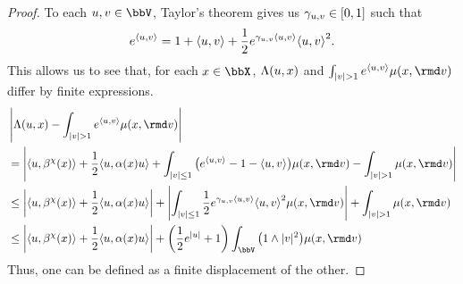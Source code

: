\begin{proof}
  \label{proof:lemma:odeSpace-rationale}
  To each $\momentVar, \vecVar \in \vecSpace$, Taylor's theorem gives us $\gamma_{u,v} \in [0,1]$ such that
  \begin{equation*}
    e^{\langle u , v \rangle} = 1 + {\langle u , v \rangle} + \frac12 e^{\gamma_{u,v} {\langle u , v \rangle}} {\langle u , v \rangle}^2.
  \end{equation*}
  This allows us to see that, for each $\stateVar \in \stateSpace$, $\Lambda(u,x)$ and $\int_{|\markVar|>1} e^\prj{\momentVar}{\markVar} \affJump(\stateVar,\rmd\markVar)$ differ by finite expressions.
  \begin{align*}
    &\left|\ode(\momentVar, \stateVar) - \int_{|\markVar|>1} e^\prj{\momentVar}{\vecVar} \affJump(\stateVar, \rmd\markVar) \right| \tag*{} \\
    &= \left|\prj{\momentVar}{\affDrift^\trunc(\stateVar)} + \frac12\prj{\momentVar}{\affDiff(\stateVar)\momentVar} + \int_{|\vecVar|\leq 1} \big( e^\prj{\momentVar}{\vecVar} - 1 - \prj{\momentVar}{\vecVar} \big) \affJump(\stateVar,\rmd\markVar) - \int_{|\vecVar|>1} \affJump(\stateVar,\rmd\markVar) \right| \\
    &\leq \left|\prj{\momentVar}{\affDrift^\trunc(\stateVar)} + \frac12\prj{\momentVar}{\affDiff(\stateVar)\momentVar} \right| + \left| \int_{|\markVar|\leq1} \frac12 e^{\gamma_{\momentVar,\markVar}\prj{\momentVar}{\markVar}} \prj{\momentVar}{\markVar}^2 \affJump(\stateVar,\rmd\markVar)\right| + \int_{|\markVar|>1} \affJump(\stateVar,\rmd\markVar) \\
    &\leq \left|\prj{\momentVar}{\affDrift^\trunc(\stateVar)} + \frac12\prj{\momentVar}{\affDiff(\stateVar)\momentVar} \right| + \left( \frac12 e^{|\momentVar|} + 1 \right) \int_\vecSpace \big(1 \wedge |\markVar|^2\big) \affJump(\stateVar, \rmd\markVar)
  \end{align*}
  Thus, one can be defined as a finite displacement of the other.
\end{proof}

